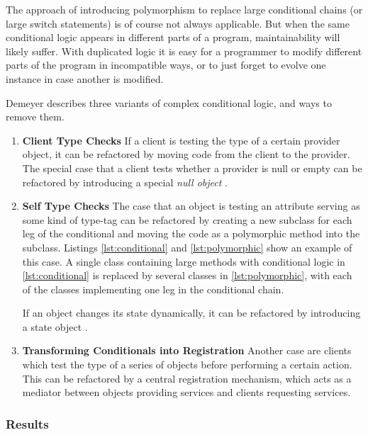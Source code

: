 \documentclass[conference,compsoc,a4paper]{IEEEtran}
\newcommand{\code}[1]{{\small\ttfamily #1}}
\begin{document}
The approach of introducing polymorphism to replace large conditional chains (or large \code{switch} statements) is of 
course not always applicable. But when the same conditional logic appears in different parts of a program, 
maintainability will likely suffer. With duplicated logic it is easy for a programmer to modify different parts of the 
program in incompatible ways, or to just forget to evolve one instance in case another is modified.

Demeyer describes three variants of complex conditional logic, and ways to remove them.

\begin{enumerate}
  \item \textbf{Client Type Checks}
  If a client is testing the type of a certain provider object, it can be refactored by moving code from the client to 
  the provider. The special case that a client tests whether a provider is \code{null} or empty can be refactored by 
  introducing a special \emph{null object} \cite{nullobject}.
  
  \item \textbf{Self Type Checks}
  The case that an object is testing an attribute serving as some kind of type-tag can be refactored by creating a new 
  subclass for each leg of the conditional and moving the code as a polymorphic method into the subclass. Listings 
  \ref{lst:conditional} and \ref{lst:polymorphic} show an example of this case. A single class containing large methods 
  with conditional logic in \autoref{lst:conditional} is replaced by several classes in \autoref{lst:polymorphic}, with 
  each of the classes implementing one leg in the conditional chain.
  
  If an object changes its state dynamically, it can be refactored by introducing a state object   
  \cite[pp.~305--313]{designpatterns}.
  
  \item \textbf{Transforming Conditionals into Registration}
  Another case are clients which test the type of a series of objects before performing a certain action. This can be 
  refactored by a central registration mechanism, which acts as a mediator between objects providing services and 
  clients requesting services.
\end{enumerate}

\subsubsection{Results}
\end{document}
